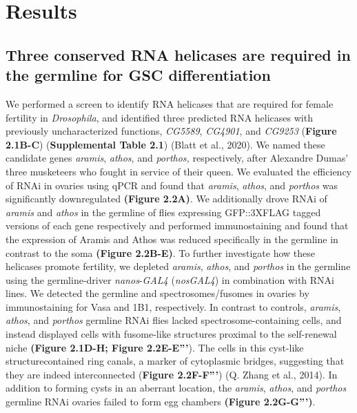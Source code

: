 \documentclass[12pt,oneside]{reedthesis}
\begin{document}
\hypertarget{results}{%
\section{Results}\label{results}}

\hypertarget{three-conserved-rna-helicases-are-required-in-the-germline-for-gsc-differentiation}{%
\subsection{Three conserved RNA helicases are required in the germline for GSC differentiation}\label{three-conserved-rna-helicases-are-required-in-the-germline-for-gsc-differentiation}}

We performed a screen to identify RNA helicases that are required for female fertility in \emph{Drosophila}, and identified three predicted RNA helicases with previously uncharacterized functions, \emph{CG5589}, \emph{CG4901}, and \emph{CG9253} (\textbf{Figure 2.1B-C}) (\textbf{Supplemental Table 2.1}) (Blatt et al., 2020). We named these candidate genes \emph{aramis}, \emph{athos}, and \emph{porthos,} respectively, after Alexandre Dumas' three musketeers who fought in service of their queen. We evaluated the efficiency of RNAi in ovaries using qPCR and found that \emph{aramis}, \emph{athos}, and \emph{porthos} was significantly downregulated \textbf{(Figure 2.2A)}. We additionally drove RNAi of \emph{aramis} and \emph{athos} in the germline of flies expressing GFP::3XFLAG tagged versions of each gene respectively and performed immunostaining and found that the expression of Aramis and Athos was reduced specifically in the germline in contrast to the soma \textbf{(Figure 2.2B-E)}. To further investigate how these helicases promote fertility, we depleted \emph{aramis}, \emph{athos}, and \emph{porthos} in the germline using the germline-driver \emph{nanos}-\emph{GAL4} (\emph{nosGAL4}) in combination with RNAi lines. We detected the germline and spectrosomes/fusomes in ovaries by immunostaining for Vasa and 1B1, respectively. In contrast to controls, \emph{aramis}, \emph{athos}, and \emph{porthos} germline RNAi flies lacked spectrosome-containing cells, and instead displayed cells with fusome-like structures proximal to the self-renewal niche \textbf{(Figure 2.1D-H; Figure 2.2E-E'''}). The cells in this cyst-like structurecontained ring canals, a marker of cytoplasmic bridges, suggesting that they are indeed interconnected (\textbf{Figure 2.2F-F'''}) (Q. Zhang et al., 2014). In addition to forming cysts in an aberrant location, the \emph{aramis}, \emph{athos}, and \emph{porthos} germline RNAi ovaries failed to form egg chambers \textbf{(Figure 2.2G-G''')}.
\end{document}
